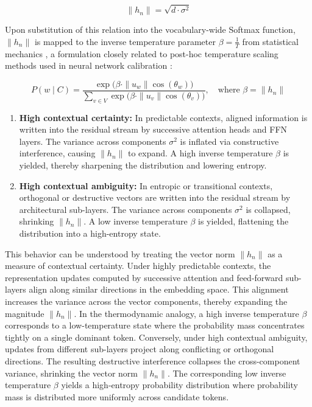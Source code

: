 \documentclass[11pt,a4paper]{article}
\begin{document}
	\begin{equation}
		\|h_n\| = \sqrt{d \cdot \sigma^2}
	\end{equation}
	
	Upon substitution of this relation into the vocabulary-wide Softmax function, $\|h_n\|$ is mapped to the inverse temperature parameter $\beta = \frac{1}{T}$ from statistical mechanics \citep{jaynes1957, ackley1985learning}, a formulation closely related to post-hoc temperature scaling methods used in neural network calibration \citep{guo2017calibration}:
	
	\begin{equation}
		P(w \mid C) = \frac{\exp\big(\beta \cdot \|u_w\| \cos(\theta_w)\big)}{\sum_{v \in V} \exp\big(\beta \cdot \|u_v\| \cos(\theta_v)\big)}, \quad \text{where } \beta = \|h_n\|
	\end{equation}
	
	\begin{enumerate}
		\item \textbf{High contextual certainty:} In predictable contexts, aligned information is written into the residual stream by successive attention heads and FFN layers. The variance across components $\sigma^2$ is inflated via constructive interference, causing $\|h_n\|$ to expand. A high inverse temperature $\beta$ is yielded, thereby sharpening the distribution and lowering entropy.
		\item \textbf{High contextual ambiguity:} In entropic or transitional contexts, orthogonal or destructive vectors are written into the residual stream by architectural sub-layers. The variance across components $\sigma^2$ is collapsed, shrinking $\|h_n\|$. A low inverse temperature $\beta$ is yielded, flattening the distribution into a high-entropy state.
	\end{enumerate}

	This behavior can be understood by treating the vector norm $\|h_n\|$ as a measure of contextual certainty. Under highly predictable contexts, the representation updates computed by successive attention and feed-forward sub-layers align along similar directions in the embedding space. This alignment increases the variance across the vector components, thereby expanding the magnitude $\|h_n\|$. In the thermodynamic analogy, a high inverse temperature $\beta$ corresponds to a low-temperature state where the probability mass concentrates tightly on a single dominant token. Conversely, under high contextual ambiguity, updates from different sub-layers project along conflicting or orthogonal directions. The resulting destructive interference collapses the cross-component variance, shrinking the vector norm $\|h_n\|$. The corresponding low inverse temperature $\beta$ yields a high-entropy probability distribution where probability mass is distributed more uniformly across candidate tokens.
	
\end{document}
